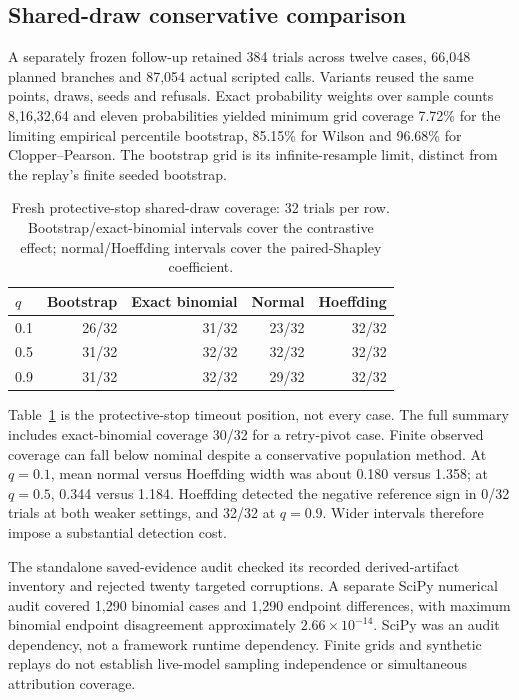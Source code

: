 \documentclass[conference]{IEEEtran}
\begin{document}
\subsection{Shared-draw conservative comparison}
A separately frozen follow-up retained 384 trials across twelve cases,
66,048 planned branches and 87,054 actual scripted calls. Variants reused
the same points, draws, seeds and refusals. Exact probability weights over
sample counts 8,16,32,64 and eleven probabilities yielded minimum grid
coverage 7.72\% for the limiting empirical percentile bootstrap, 85.15\% for
Wilson and 96.68\% for Clopper--Pearson. The bootstrap grid is its
infinite-resample limit, distinct from the replay's finite seeded bootstrap.

\begin{table}[t]
\caption{Fresh protective-stop shared-draw coverage: 32 trials per row.
Bootstrap/exact-binomial intervals cover the contrastive effect;
normal/Hoeffding intervals cover the paired-Shapley coefficient.}
\label{tab:followup}
\centering\footnotesize
\begin{tabular}{lrrrr}
\toprule
$q$ & Bootstrap & Exact binomial & Normal & Hoeffding\\
\midrule
0.1 & 26/32 & 31/32 & 23/32 & 32/32\\
0.5 & 31/32 & 32/32 & 32/32 & 32/32\\
0.9 & 31/32 & 32/32 & 29/32 & 32/32\\
\bottomrule
\end{tabular}
\end{table}

Table~\ref{tab:followup} is the protective-stop timeout position, not every
case. The full summary includes exact-binomial coverage 30/32 for a retry-pivot
case. Finite observed coverage can fall below nominal despite a conservative
population method. At $q=0.1$, mean normal versus Hoeffding width was about
0.180 versus 1.358; at $q=0.5$, 0.344 versus 1.184. Hoeffding detected the
negative reference sign in 0/32 trials at both weaker settings, and 32/32 at
$q=0.9$. Wider intervals therefore impose a substantial detection cost.

The standalone saved-evidence audit checked its recorded derived-artifact
inventory and rejected twenty targeted corruptions. A
separate SciPy numerical audit covered 1,290 binomial cases and 1,290 endpoint
differences, with maximum binomial endpoint disagreement approximately
$2.66\times10^{-14}$. SciPy was an audit dependency, not a framework runtime
dependency. Finite grids and synthetic replays do not establish live-model
sampling independence or simultaneous attribution coverage.
\end{document}
